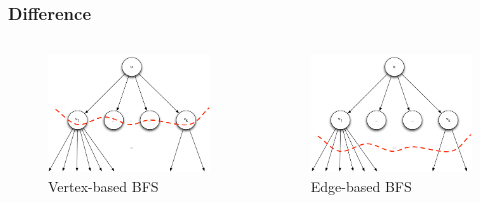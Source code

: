 \begin{frame}
  \frametitle{Difference}

  \begin{columns}[onlytextwidth]
    \begin{column}{0.5\textwidth}
      \begin{figure}[t]
        \centering
        \includegraphics[width=\textwidth, height=0.6\textheight, keepaspectratio]{imgs/gpu-vertex-bfs}
        \caption{Vertex-based BFS}
      \end{figure}
    \end{column}

    \begin{column}{0.5\textwidth}
      \begin{figure}[t]
        \centering
        \includegraphics[width=\textwidth, height=0.6\textheight, keepaspectratio]{imgs/gpu-edge-bfs}
        \caption{Edge-based BFS}
      \end{figure}
    \end{column}
  \end{columns}

\end{frame}


